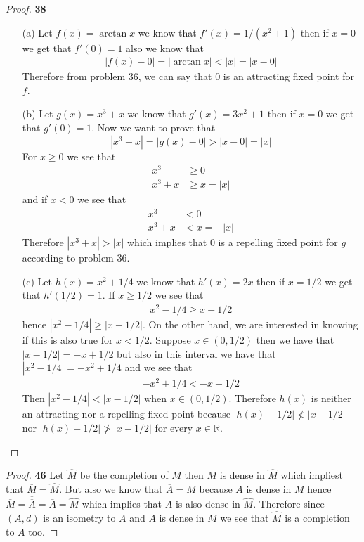 \documentclass[11pt]{article}
\newcommand{\R}{\mathbb{R}}
\theoremstyle{definition}
\begin{document}
\cleardoublepage
    \begin{proof}{\textbf{38}}
    \begin{itemize}
    \item [(a)] Let $f(x) = \arctan x$ we know that $f'(x) = 1/(x^2 + 1)$ then
    if $x = 0$ we get that $f'(0) = 1$ also we know that
    \begin{align*}
        |f(x) - 0| = |\arctan x| < |x| = |x - 0|
    \end{align*}
    Therefore from problem 36, we can say that $0$ is an attracting fixed point
    for $f$.
    \item [(b)] Let $g(x) = x^3 + x$ we know that $g'(x) = 3x^2 + 1$ then
    if $x = 0$ we get that $g'(0) = 1$. Now we want to prove that
    $$|x^3 + x| = |g(x) - 0| > |x -0| = |x|$$
    For $x \geq 0$ we see that
    \begin{align*}
        x^3 &\geq 0\\
        x^3 + x &\geq x = |x|
    \end{align*}
    and if $x < 0$ we see that
    \begin{align*}
        x^3 &< 0\\
        x^3 + x &< x = -|x|
    \end{align*}
    Therefore $|x^3 + x| > |x|$ which implies that $0$ is a repelling fixed
    point for $g$ according to problem 36.

    \item [(c)] Let $h(x) = x^2 + 1/4$ we know that $h'(x) = 2x$ then
    if $x = 1/2$ we get that $h'(1/2) = 1$. If $x \geq 1/2$ we see that
    \begin{align*}
        x^2 - 1/4 \geq x - 1/2
    \end{align*}
    hence $|x^2 - 1/4| \geq |x - 1/2|$. On the other hand, we are interested in
    knowing if this is also true for $x < 1/2$. Suppose $x \in (0, 1/2)$
    then we have that $|x - 1/2| = -x + 1/2$ but also in this interval we have
    that $|x^2 - 1/4| = -x^2 + 1/4$ and we see that
    \begin{align*}
        -x^2 + 1/4 < -x + 1/2
    \end{align*}
    Then $|x^2 - 1/4| < |x - 1/2|$ when $x \in (0, 1/2)$. Therefore $h(x)$ is
    neither an attracting nor a repelling fixed point because
    $|h(x) - 1/2| \not< |x - 1/2|$ nor $|h(x) - 1/2| \not> |x - 1/2|$ for
    every $x \in \R$.
    \end{itemize}
    \end{proof}
    \begin{proof}{\textbf{46}}
        Let $\hat{M}$ be the completion of $M$ then $M$ is dense in $\hat{M}$
        which impliest that $\overline{M} = \hat{M}$. But also we know that
        $\overline{A} = M$ because $A$ is dense in $M$ hence
        $\overline{M} = \overline{\overline{A}} = \overline{A}= \hat{M}$
        which implies that $A$ is also dense in $\hat{M}$. Therefore since
        $(A,d)$ is an isometry to $A$ and $A$ is dense in $\hat{M}$ we see
        that $\hat{M}$ is a completion to $A$ too.
    \end{proof}
\end{document}

